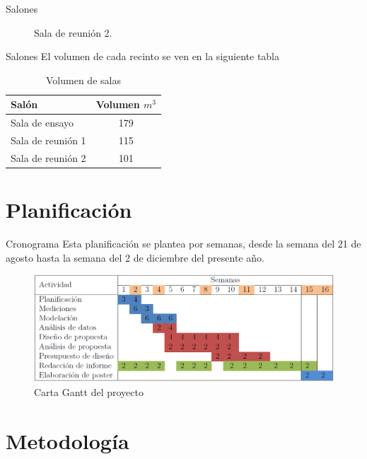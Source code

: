 \documentclass{sintefbeamer}
\begin{document}
\begin{frame}{Salones}
\begin{figure}[!htb]
  \caption{Sala de reunión 2.}\label{fig:sala-reunion2}
\endminipage
\end{figure}
\end{frame}
\begin{frame}{Salones}
El volumen de cada recinto se ven en la siguiente tabla
    \begin{table}[H]
        \centering
        \caption{Volumen de salas}
        \label{tab:volumne de salas}
        \begin{tabular}{|l|c|}
        \hline
         \textbf{Salón} & \textbf{Volumen $m^3$} \\ \hline
         Sala de ensayo & 179 \\ \hline
         Sala de reunión 1 & 115 \\ \hline
         Sala de reunión 2 & 101 \\ \hline
        \end{tabular}
    \end{table}
\end{frame}
\section{Planificación}

\begin{frame}{Cronograma}
Esta planificación se plantea por semanas, desde la semana del 21 de agosto hasta la semana del 2 de diciembre del presente año. 
\begin{figure}
    \centering
    \includegraphics[width=\textwidth]{images/CartaGantt}
    \caption{Carta Gantt del proyecto}
    \label{fig:carta gantt}
\end{figure}

\end{frame}

\section{Metodología}
\end{document}
